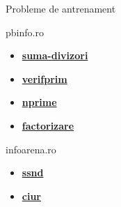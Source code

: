 ﻿\documentclass{beamer}
\begin{document}
\begin{frame}{Probleme de antrenament}
  \begin{block}{pbinfo.ro}
    \begin{itemize}
      \item \href{https://www.pbinfo.ro/probleme/376/suma-divizori}{\textbf{suma-divizori}}
      \item \href{https://www.pbinfo.ro/probleme/45/verifprim}{\textbf{verifprim}}
      \item \href{https://www.pbinfo.ro/probleme/373/nprime}{\textbf{nprime}}
      \item \href{https://www.pbinfo.ro/probleme/62/factorizare}{\textbf{factorizare}}
    \end{itemize}
  \end{block}
  \begin{block}{infoarena.ro}
    \begin{itemize}
      \item \href{https://www.infoarena.ro/problema/ssnd}{\textbf{ssnd}}
      \item \href{https://www.infoarena.ro/problema/ciur}{\textbf{ciur}}
    \end{itemize}
  \end{block}
\end{frame}
\end{document}
